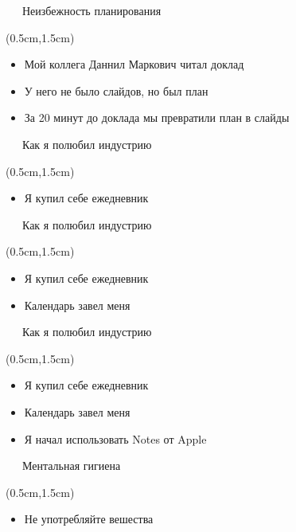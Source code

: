 \documentclass[xetex,18pt,aspectratio=43]{beamer}
\begin{document}
\begin{Large}
\begin{frame}{\ \ \ Неизбежность планирования}
\begin{textblock*}{\framewidth-0.8cm}(0.5cm,1.5cm)
\begin{itemize}
  \item Мой коллега Даннил Маркович читал доклад
  \item У него не было слайдов, но был план
  \item За 20 минут до доклада мы превратили план в слайды
\end{itemize}
\end{textblock*}
\end{frame}

\begin{frame}{\ \ \ Как я полюбил индустрию}
\begin{textblock*}{\framewidth-0.8cm}(0.5cm,1.5cm)
\begin{itemize}
  \item Я купил себе ежедневник
\end{itemize}
\end{textblock*}
\end{frame}

\begin{frame}{\ \ \ Как я полюбил индустрию}
\begin{textblock*}{\framewidth-0.8cm}(0.5cm,1.5cm)
\begin{itemize}
  \item Я купил себе ежедневник
  \item Календарь завел меня
\end{itemize}
\end{textblock*}
\end{frame}

\begin{frame}{\ \ \ Как я полюбил индустрию}
\begin{textblock*}{\framewidth-0.8cm}(0.5cm,1.5cm)
\begin{itemize}
  \item Я купил себе ежедневник
  \item Календарь завел меня
  \item Я начал использовать Notes от Apple
\end{itemize}
\end{textblock*}
\end{frame}

\begin{frame}{\ \ \ Ментальная гигиена}
\begin{textblock*}{\framewidth-0.8cm}(0.5cm,1.5cm)
\begin{itemize}
  \item Не употребляйте вешества
\end{itemize}
\end{textblock*}
\end{frame}


\end{Large}
\end{document}
